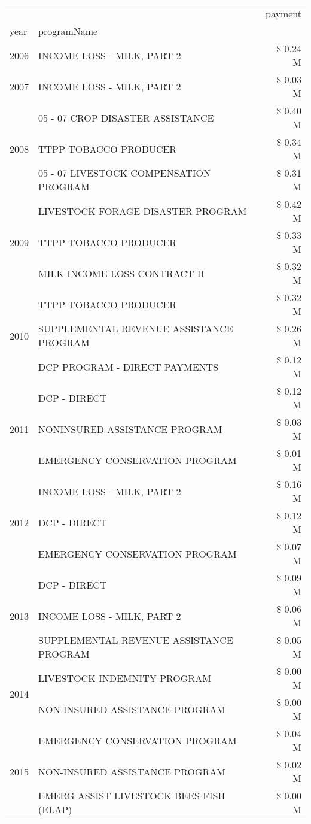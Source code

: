 \begin{tabular}{llr}
\toprule
 &  & payment \\
year & programName &  \\
\midrule
2006 & INCOME LOSS - MILK, PART 2 & \$ 0.24 M \\
\cline{1-3}
2007 & INCOME LOSS - MILK, PART 2 & \$ 0.03 M \\
\cline{1-3}
\multirow[t]{3}{*}{2008} & 05 - 07 CROP DISASTER ASSISTANCE & \$ 0.40 M \\
 & TTPP TOBACCO PRODUCER & \$ 0.34 M \\
 & 05 - 07 LIVESTOCK COMPENSATION PROGRAM & \$ 0.31 M \\
\cline{1-3}
\multirow[t]{3}{*}{2009} & LIVESTOCK FORAGE DISASTER  PROGRAM & \$ 0.42 M \\
 & TTPP TOBACCO PRODUCER & \$ 0.33 M \\
 & MILK INCOME LOSS CONTRACT II & \$ 0.32 M \\
\cline{1-3}
\multirow[t]{3}{*}{2010} & TTPP TOBACCO PRODUCER & \$ 0.32 M \\
 & SUPPLEMENTAL REVENUE ASSISTANCE PROGRAM & \$ 0.26 M \\
 & DCP PROGRAM - DIRECT PAYMENTS & \$ 0.12 M \\
\cline{1-3}
\multirow[t]{3}{*}{2011} & DCP - DIRECT & \$ 0.12 M \\
 & NONINSURED ASSISTANCE PROGRAM & \$ 0.03 M \\
 & EMERGENCY CONSERVATION PROGRAM & \$ 0.01 M \\
\cline{1-3}
\multirow[t]{3}{*}{2012} & INCOME LOSS - MILK, PART 2 & \$ 0.16 M \\
 & DCP - DIRECT & \$ 0.12 M \\
 & EMERGENCY CONSERVATION PROGRAM & \$ 0.07 M \\
\cline{1-3}
\multirow[t]{3}{*}{2013} & DCP - DIRECT & \$ 0.09 M \\
 & INCOME LOSS - MILK, PART 2 & \$ 0.06 M \\
 & SUPPLEMENTAL REVENUE ASSISTANCE PROGRAM & \$ 0.05 M \\
\cline{1-3}
\multirow[t]{2}{*}{2014} & LIVESTOCK INDEMNITY PROGRAM & \$ 0.00 M \\
 & NON-INSURED ASSISTANCE PROGRAM & \$ 0.00 M \\
\cline{1-3}
\multirow[t]{3}{*}{2015} & EMERGENCY CONSERVATION PROGRAM & \$ 0.04 M \\
 & NON-INSURED ASSISTANCE PROGRAM & \$ 0.02 M \\
 & EMERG ASSIST LIVESTOCK BEES FISH (ELAP) & \$ 0.00 M \\

\end{tabular}
